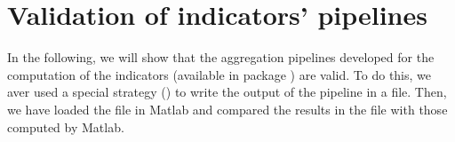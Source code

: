 \section{Validation of indicators' pipelines}\label{sec:indicatorsvalidation}

In the following, we will show that the aggregation pipelines developed for the
computation of the indicators (available in package
) are valid. To do this, we aver used a
special strategy () to write the output of the
pipeline in a file. Then, we have loaded the file in Matlab and compared the
results in the file with those computed by Matlab.
